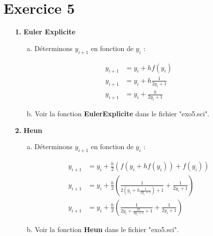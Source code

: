 \documentclass[12pt, letterpaper]{article}
\begin{document}
\section*{Exercice 5}

\begin{enumerate}

\item[\textbf{1.}]\textbf{Euler Explicite}

\begin{enumerate}

\item[a.] Déterminons $y_{i+1}$ en fonction de $y_i$ :

  \begin{equation*}
    \begin{split}
      y_{i+1} & = y_i + h f(y_i) \\
      y_{i+1} & = y_i + h \frac{1}{2y_i + 1} \\
      y_{i+1} & = y_i + \frac{h}{2y_i + 1}
    \end{split}
  \end{equation*}

\item[b.] Voir la fonction \textbf{EulerExplicite} dans le fichier "exo5.sci".
  
\end{enumerate}

\item[\textbf{2.}] \textbf{Heun}

\begin{enumerate}

\item[a.] Déterminons $y_{i+1}$ en fonction de $y_i$ :

  \begin{equation*}
    \begin{split}
      y_{i+1} & = y_i + \frac{h}{2} (f(y_i + h f(y_i)) + f(y_i)) \\
      y_{i+1} & = y_i + \frac{h}{2} (\frac{1}{2(y_i + h \frac{1}{2y_i
          + 1}) + 1} + \frac{1}{2y_i + 1}) \\
      y_{i+1} & = y_i + \frac{h}{2} (\frac{1}{2y_i + \frac{2h}{2y_i
          + 1} + 1} + \frac{1}{2y_i + 1})
    \end{split}
  \end{equation*}

\item[b.] Voir la fonction \textbf{Heun} dans le fichier "exo5.sci".

\end{enumerate}


\end{enumerate}
\end{document}
